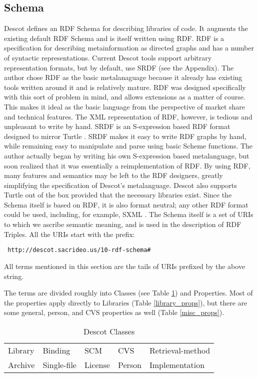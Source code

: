 \documentclass[9pt,cm,twocolumn,preprint]{sigplanconf}
\begin{document}
\subsection{Schema}%
Descot defines an RDF Schema \cite{descotschema,rdfprimer} for describing 
libraries of code. 
It augments the existing default RDF Schema \cite{rdf} 
and is itself written using RDF. 
RDF is a specification for describing metainformation as 
directed graphs and has a number of syntactic representations. 
Current Descot tools support arbitrary representation 
formats, but by default, use SRDF (see the Appendix). 
The author chose RDF as the basic metalanaguage 
because it already has existing tools written around it 
and is relatively mature. RDF was designed specifically with 
this sort of problem in mind, and allows extensions as a matter of course. 
This makes it ideal as the basic language from the perspective of 
market share and technical features. 
The XML representation of RDF, however, is tedious and 
unpleasant to write by hand.
SRDF is an S-expression based RDF format designed to mirror 
Turtle \cite{turtle}. 
SRDF makes it easy to write RDF graphs by hand, 
while remaining easy to manipulate and parse using basic Scheme functions.
The author actually began by writing his own S-expression based 
metalanguage, but soon realized that it was essentially a reimplementation 
of RDF. 
By using RDF, many features and semantics may be left to the RDF 
designers, greatly simplifying the specification of Descot's metalanguage. 
Descot also supports Turtle out of the box provided that the 
necessary libraries exist. 
Since the Schema itself is based on RDF, 
it is also format neutral; any other RDF format could be used, 
including, for example, SXML \cite{oleg_site}. 
The Schema itself is a set of URIs to which we ascribe 
semantic meaning, and is used in the description of 
RDF Triples. 
All the URIs start with the prefix:

{\narrower\tt
  http://descot.sacrideo.us/10-rdf-schema\#}

\noindent All terms mentioned in this section
are the tails of URIs prefixed by the above string. 

The terms are divided roughly into Classes (see Table \ref{classes}) 
and Properties. Most 
of the properties apply directly to Libraries (Table \ref{library_props}), 
but there are some 
general, person, and CVS properties as well (Table \ref{misc_props}). 

\begin{table}
\begin{center}
\begin{tabular}{lllll}
Library & Binding & SCM & CVS & Retrieval-method \\
Archive & Single-file & License & Person & Implementation \\
\end{tabular}
\end{center}
\caption{Descot Classes}
\label{classes}
\end{table}
\end{document}
